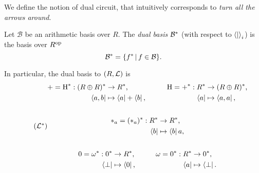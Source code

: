 We define the notion of dual circuit, that intuitively corresponds to
\emph{turn all the arrows around}.

\begin{definition}
  Let $\mathcal{B}$ be an arithmetic basis over $R$. The
  \emph{dual basis} $\mathcal{B}^\ast$
  (with respect to $\left\langle  \middle|  \right\rangle_i$) is the basis over $R^{\mathrm{op}}$
  \begin{equation}
    \label{eq:241}
    \mathcal{B}^\ast = \{f^\ast \,|\, f\in\mathcal{B}\}
    \text{.}
  \end{equation}
\end{definition}

In particular, the dual basis to $(R,\mathcal{L})$ is 
\begin{equation}
  \label{eq:tbasis-star}
  \tag{$\dual{\Tbasis}$}
  \begin{gathered}
    \begin{aligned}
      +=\dual{\hub} : \dual{(R\oplus R)} &\ra \dual{R}\text{,}  &  \hub=\dual{+} : \dual{R} &\ra \dual{(R\oplus R)}\text{,}\\
      \bra{a,b} &\mapsto \bra{a}+\bra{b}\text{,}\qquad   &      \bra{a} &\mapsto \bra{a,a}\text{,}\\
    \end{aligned}\\ \\
    \begin{aligned}
      \rmul{a}=\dual{(\rmul{a})} : \dual{R} &\ra \dual{R}\text{,} \\
                                             \bra{b} &\mapsto \bra{b}a\text{,}
    \end{aligned}\\ \\
    \begin{aligned}
      0=\dual{\omega} : \dual{0} &\ra \dual{R}\text{,}\qquad  & \omega=\dual{0} : \dual{R} &\ra \dual{0}\text{,} \\
      \bra{\bom} &\mapsto \bra{0}\text{,} &          \bra{a} &\mapsto \bra{\bom}\text{.}
    \end{aligned}
  \end{gathered}
\end{equation}


